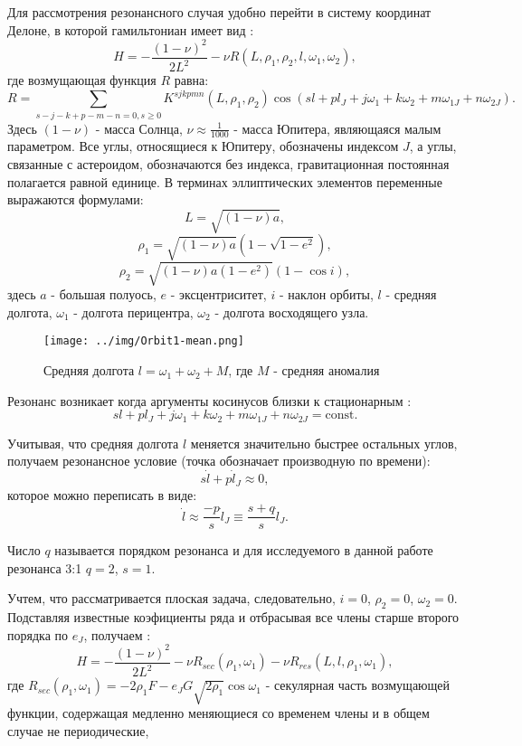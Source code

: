  
Для рассмотрения резонансного случая удобно перейти в систему координат Делоне, в которой гамильтониан имеет вид \cite{plummer}:
$$H = - \frac{(1-\nu)^2}{2L^2} - \nu R(L, \rho_1, \rho_2, l, \omega_1, \omega_2),$$
где возмущающая функция $R$ равна:
$$R = \sum_{s-j-k+p-m-n=0, s \geq 0} K^{sjkpmn}(L, \rho_1, \rho_2) \cos(s l + p l_J + j \omega_1 + k \omega_2 + m \omega_{1J} + n \omega_{2J}).$$
Здесь $(1-\nu)$ - масса Солнца, $\nu \approx \frac{1}{1000}$ - масса Юпитера, являющаяся малым параметром. Все углы, относящиеся к Юпитеру, обозначены индексом $J$, а углы, связанные с астероидом, обозначаются без индекса, гравитационная постоянная полагается равной единице. В терминах эллиптических элементов переменные выражаются формулами:
$$L = \sqrt{(1-\nu)a},$$
$$\rho_1 = \sqrt{(1-\nu)a}(1-\sqrt{1-e^2}),$$
$$\rho_2 = \sqrt{(1-\nu)a(1-e^2)}(1-\cos i),$$
здесь $a$ - большая полуось, $e$ - эксцентриситет, $i$ - наклон орбиты, $l$ - средняя долгота, $\omega_1$ - долгота перицентра, $\omega_2$ - долгота восходящего узла.

\begin{figure}[htp]
\centering
\texttt{[image: ../img/Orbit1-mean.png]}
\caption{Средняя долгота $l = \omega_1 + \omega_2 + M$, где $M$ - средняя аномалия}
\end{figure}

Резонанс возникает когда аргументы косинусов близки к стационарным \cite{wis2}:
$$s l + p l_J + j \omega_1 + k \omega_2 + m \omega_{1J} + n \omega_{2J} = \text{const}.$$

Учитывая, что средняя долгота $l$ меняется значительно быстрее остальных углов, получаем резонансное условие (точка обозначает производную по времени):
$$s \dot l + p \dot l_J \approx 0, $$
которое можно переписать в виде:
$$\dot l \approx \frac{-p}{s} \dot l_J \equiv \frac{s+q}{s} \dot l_J.$$

Число $q$ называется порядком резонанса и для исследуемого в данной работе резонанса 3:1 $q=2$, $s=1$.

Учтем, что рассматривается плоская задача, следовательно, $i=0$, $\rho_2=0$, $\omega_2=0$. Подставляя известные коэфициенты ряда и отбрасывая все члены старше второго порядка по $e_J$, получаем \cite{wis2}:
$$H = - \frac{(1-\nu)^2}{2L^2} - \nu R_{sec}(\rho_1, \omega_1) - \nu R_{res}(L,l,\rho_1,\omega_1),$$
где $R_{sec}(\rho_1, \omega_1) = - 2 \rho_1 F - e_J G \sqrt{2 \rho_1} \cos \omega_1$ - секулярная часть возмущающей функции, содержащая медленно меняющиеся со временем члены и в общем случае не периодические, 

